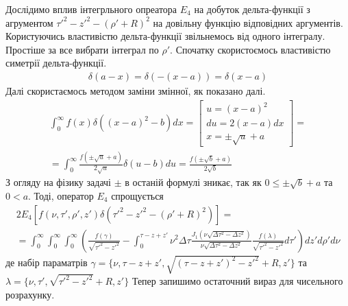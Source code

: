 Дослідимо вплив інтегрльного опреатора $ E_4 $ на добуток  дельта-функції 
з агрументом $ {\tau'}^2 - {z'}^2 - (\rho'+R)^2 $ на довільну функцію 
відповідних аргументів. Користуючись властивістю дельта-функції звільнемось 
від одного інтегралу. Простіше за все вибрати інтеграл по $ \rho' $. 
Спочатку скористоємось властивістю симетрії дельта-функції.
%
\begin{equation*} \begin{aligned}
\delta \left( a - x \right) = \delta \left( - (x - a) \right) = 
\delta \left( x - a \right)
\end{aligned} \end{equation*}
%
Далі скористаємось методом заміни змінної, як показано далі.
%
\begin{equation*} \begin{aligned}
\int_0^\infty f(x) \delta \left( (x-a)^2 - b \right) dx = 
\left[ \begin{array}{l}
u = (x-a)^2 \\
du = 2 (x-a) dx \\
x = \pm \sqrt{u} + a
\end{array} \right] = \\  
= \int_0^\infty \frac{f(\pm \sqrt{u}+a)}{2 \sqrt{u}} 
\delta \left( u - b \right) du = 
\frac{f(\pm \sqrt{b}+a)}{2 \sqrt{b}}
\end{aligned} \end{equation*}
%
З огляду на фізику задачі $ \pm $ в останій формулі зникає, так як 
$ 0 \leq \pm \sqrt{b}+a $ та $ 0 < a $. Тоді, оператор $ E_4 $
спрощується 
%
\begin{equation*} \begin{aligned}
2 E_4 \left[ f(\nu,\tau',\rho',z') \delta 
\left( {\tau'}^2 - {z'}^2 - (\rho'+R)^2 \right) \right] = \\
= \int_0^\infty \int_0^\infty \int_0^\infty
\left( \frac{f (\gamma)}{\sqrt{{\tau'}^2 - {z'}^2}} - 
\int_0^{\tau - z + z'} \nu^2 \Delta \tau 
\frac{J_1 \left( \nu \sqrt{\Delta \tau^2 - \Delta z^2} \right)}
{\nu \sqrt{\Delta \tau^2 - \Delta z^2}} 
\frac{f (\lambda)}{\sqrt{{\tau'}^2 - {z'}^2}} 
d \tau' \right) dz' d \rho' d \nu
\end{aligned} \end{equation*}
%
де набір параматрів 
$ \gamma = \{\nu, \tau-z+z', \sqrt{(\tau-z+z')^2 - {z'}^2} + R, z'\} $ та
$ \lambda = \{\nu, \tau', \sqrt{{\tau'}^2 - {z'}^2} + R, z'\} $ 
%
Тепер запишимо остаточний вираз для чисельного розрахунку.
%
